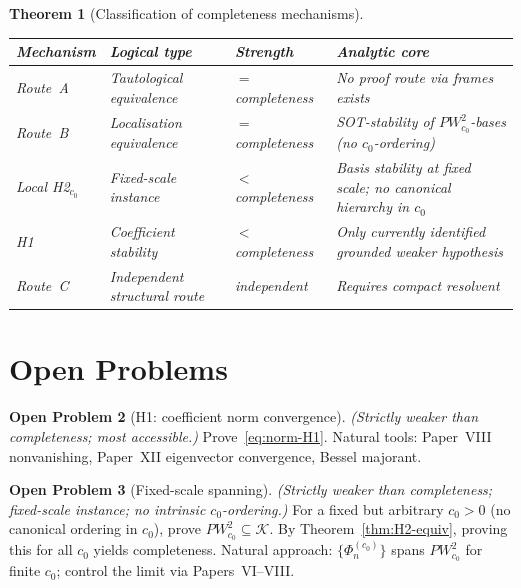 \documentclass[12pt,a4paper]{amsart}
\newtheorem{theorem}{Theorem}[section]
\theoremstyle{definition}
\newtheorem{problem}[theorem]{Open Problem}
\theoremstyle{remark}
\newcommand{\Phic}[2]{\Phi_{#2}^{(#1)}}
\newcommand{\PW}{PW}
\newcommand{\Kspace}{\mathcal{K}}
\begin{document}
\begin{theorem}[Classification of completeness mechanisms]
\label{thm:classification}
\hfill
\begin{center}
\renewcommand{\arraystretch}{1.4}
\begin{tabular}{lllp{4.5cm}}
\toprule
Mechanism & Logical type & Strength & Analytic core \\
\midrule
Route~A & Tautological equivalence
  & $=$ completeness
  & No proof route via frames exists \\
Route~B & Localisation equivalence
  & $=$ completeness
  & SOT-stability of $\PW_{c_0}^2$-bases
    (no $c_0$-ordering) \\
Local H2$_{c_0}$ & Fixed-scale instance
  & $<$ completeness
  & Basis stability at fixed scale;
    no canonical hierarchy in $c_0$ \\
H1 & Coefficient stability
  & $<$ completeness
  & Only currently identified
    grounded weaker hypothesis \\
Route~C & Independent structural route
  & independent
  & Requires compact resolvent \\
\bottomrule
\end{tabular}
\end{center}
\end{theorem}

\section{Open Problems}
\label{sec:open}

\begin{problem}[H1: coefficient norm convergence]
\label{prob:H1}
\emph{(Strictly weaker than completeness; most accessible.)}
Prove~\eqref{eq:norm-H1}.
Natural tools: Paper~VIII nonvanishing,
Paper~XII eigenvector convergence, Bessel majorant.
\end{problem}

\begin{problem}[Fixed-scale spanning]
\label{prob:local-span}
\emph{(Strictly weaker than completeness;
fixed-scale instance; no intrinsic $c_0$-ordering.)}
For a fixed but arbitrary $c_0 > 0$
(no canonical ordering in $c_0$),
prove $\PW_{c_0}^2\subseteq\Kspace$.
By Theorem~\ref{thm:H2-equiv},
proving this for all $c_0$ yields completeness.
Natural approach: $\{\Phic{c_0}{n}\}$ spans
$\PW_{c_0}^2$ for finite $c_0$; control the limit
via Papers~VI--VIII.
\end{problem}
\end{document}
